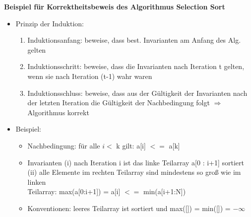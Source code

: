\documentclass[11pt, fleqn]{scrreprt}
\begin{document}
    \textbf{Beispiel für Korrektheitsbeweis des Algorithmus Selection Sort}
    \begin{itemize}
        \item Prinzip der Induktion:
        \begin{enumerate}
            \item Induktionsanfang: beweise, dass best. Invarianten am Anfang des Alg. gelten
            \item Induktionsschritt: beweise, dass die Invarianten nach Iteration t gelten, wenn sie nach Iteration (t-1) wahr waren
            \item Induktionsschluss: beweise, dass aus der Gültigkeit der Invarianten nach der letzten Iteration die Gültigkeit der Nachbedingung folgt $\Rightarrow$ Algorithmus korrekt
        \end{enumerate}
        \item Beispiel:
        \begin{itemize}[label={}]
            \item Nachbedingung: für alle $i < $ k gilt: a[i] $<=$ a[k]
            \item Invarianten (i) nach Iteration i ist das linke Teilarray a[0 : i+1] sortiert \\
            \hspace*{2cm}(ii) alle Elemente im rechten Teilarray sind mindestens so groß wie im linken \\
            \hspace*{2,6cm}Teilarray: max(a[0:i+1]) = a[i] $<=$ min(a[i+1:N])
            \item Konventionen: leeres Teilarray ist sortiert und max([]) = min([]) = $- \infty$
        \end{itemize}


\end{itemize}
\end{document}
